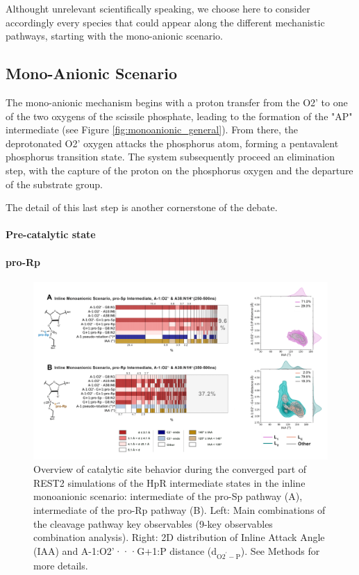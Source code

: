 \documentclass[journal=jacsat,manuscript=article]{achemso}
\begin{document}
Althought unrelevant scientifically speaking, 
we choose here to consider accordingly every species that could appear along the different mechanistic pathways, 
starting with the mono-anionic scenario. 

\subsection{Mono-Anionic Scenario}

The mono-anionic mechanism begins with a proton transfer from the O2' to one of the two oxygens of the scissile phosphate,
leading to the formation of the "AP" intermediate (see Figure \ref{fig:monoanionic_general}).
From there, the deprotonated O2' oxygen attacks the phosphorus atom, forming a pentavalent phosphorus transition state.
The system subsequently proceed an elimination step, with the capture of the proton on the phosphorus oxygen and the departure of the substrate group.


The detail of this last step is another cornerstone of the debate. 


\paragraph{Pre-catalytic state}

\paragraph{pro-Rp }

\begin{figure}[b!]
    \centering
    \includegraphics[width=1.0\textwidth]{figures/2D_orderedHbonds_A1P-A38H.png}
    \caption[Overview of the Inline Monoanionic Intermediates (ligated)]
    {Overview of catalytic site behavior during the converged part of REST2 simulations of the 
    HpR intermediate states in the inline monoanionic scenario: 
    intermediate of the pro-Sp pathway (A), 
    intermediate of the pro-Rp pathway (B). 
    Left: Main combinations of the cleavage pathway key observables (9-key observables combination analysis).
    Right: 2D distribution of Inline Attack Angle (IAA) and A-1:O2'···G+1:P distance (d$_\mathrm{O2^{\prime}-P}$). See Methods for more details.}
    \label{fig:2D_int_monoanionic}
\end{figure}
\end{document}
